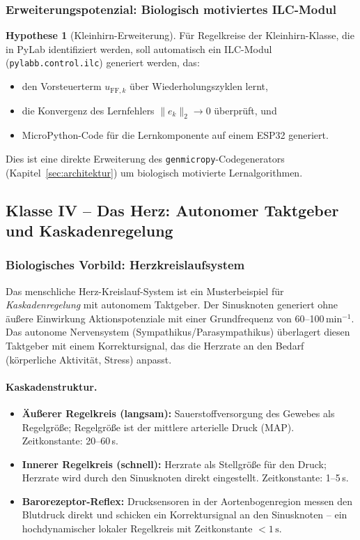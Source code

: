 \documentclass[a4paper,12pt]{article}
\theoremstyle{definition}
\newtheorem{hypothese}{Hypothese}
\begin{document}
\subsubsection{Erweiterungspotenzial: Biologisch motiviertes ILC-Modul}

\begin{hypothese}[Kleinhirn-Erweiterung]
	Für Regelkreise der Kleinhirn-Klasse, die in PyLab identifiziert werden,
	soll automatisch ein ILC-Modul (\texttt{pylabb.control.ilc}) generiert werden,
	das:
	\begin{itemize}
		\item den Vorsteuerterm $u_{\mathrm{FF},k}$ über Wiederholungszyklen lernt,
		\item die Konvergenz des Lernfehlers $\|e_k\|_2 \to 0$ überprüft, und
		\item MicroPython-Code für die Lernkomponente auf einem ESP32 generiert.
	\end{itemize}
	Dies ist eine direkte Erweiterung des \texttt{genmicropy}-Codegenerators
	(Kapitel~\ref{sec:architektur}) um biologisch motivierte Lernalgorithmen.
\end{hypothese}

\subsection{Klasse IV -- Das Herz: Autonomer Taktgeber und Kaskadenregelung}
\label{subsec:klasse_herz}

\subsubsection{Biologisches Vorbild: Herzkreislaufsystem}

Das menschliche Herz-Kreislauf-System ist ein Musterbeispiel für
\emph{Kaskadenregelung} mit autonomem Taktgeber. Der Sinusknoten generiert
ohne äußere Einwirkung Aktionspotenziale mit einer Grundfrequenz von
60--100\,min$^{-1}$. Das autonome Nervensystem (Sympathikus/Parasympathikus)
überlagert diesen Taktgeber mit einem Korrektursignal, das die Herzrate
an den Bedarf (körperliche Aktivität, Stress) anpasst.

\paragraph{Kaskadenstruktur.}
\begin{itemize}
	\item \textbf{Äußerer Regelkreis (langsam):} Sauerstoffversorgung des
	Gewebes als Regelgröße; Regelgröße ist der mittlere arterielle Druck
	(MAP). Zeitkonstante: 20--60\,s.
	\item \textbf{Innerer Regelkreis (schnell):} Herzrate als Stellgröße für
	den Druck; Herzrate wird durch den Sinusknoten direkt eingestellt.
	Zeitkonstante: 1--5\,s.
	\item \textbf{Barorezeptor-Reflex:} Drucksensoren in der Aortenbogenregion
	messen den Blutdruck direkt und schicken ein Korrektursignal an den
	Sinusknoten -- ein hochdynamischer lokaler Regelkreis mit Zeitkonstante
	$< 1\,\text{s}$.
\end{itemize}
\end{document}
